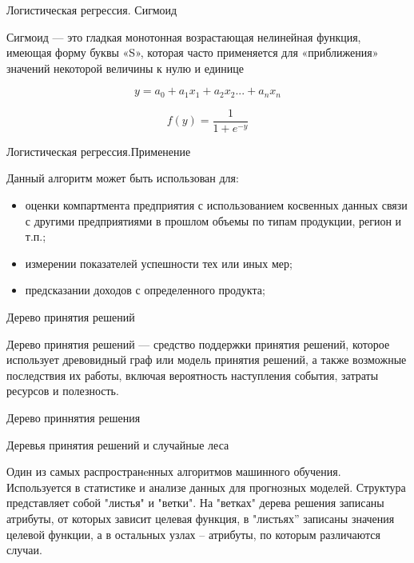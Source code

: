 \documentclass[10pt,pdf,hyperref={unicode}]{beamer}
\begin{document}
\begin{frame}{Логистическая регрессия. Сигмоид}

Сигмоид — это гладкая монотонная возрастающая нелинейная функция,
 имеющая форму буквы «S», которая часто применяется для «приближения» 
 значений некоторой величины к нулю и единице


$$  y=a_0 + a_1x_1+ a_2x_2 ...+a_nx_n $$

$$ f(y) = \frac{1}{1 + e^{-y}}$$



\end{frame}



\begin{frame}{Логистическая регрессия.Применение}

Данный алгоритм может быть использован для:
    \begin{itemize}

  \item оценки компартмента предприятия с использованием косвенных данных связи с другими предприятиями в прошлом объемы по типам продукции, регион и т.п.;
  \item измерении показателей успешности  тех или иных мер;
  \item предсказании доходов с определенного продукта;
    \end{itemize}
    

\end{frame}





\begin{frame}{Дерево принятия решений}

Дерево принятия решений — средство поддержки принятия решений, которое использует 
древовидный граф или модель принятия решений, а также возможные последствия их работы, 
включая вероятность наступления события, затраты ресурсов и полезность. 

\end{frame}


\begin{frame}{Дерево приннятия решения}

Деревья принятия решений и случайные леса

Один из самых распространeнных алгоритмов машинного обучения.
 Используется в статистике и анализе данных для прогнозных моделей. 
 Структура представляет собой "листья" и "ветки". 
 На "ветках" дерева решения записаны атрибуты, 
 от которых зависит целевая функция, в "листьях” записаны значения целевой функции, 
 а в остальных узлах – атрибуты, по которым различаются случаи.

\end{frame}
\end{document}

